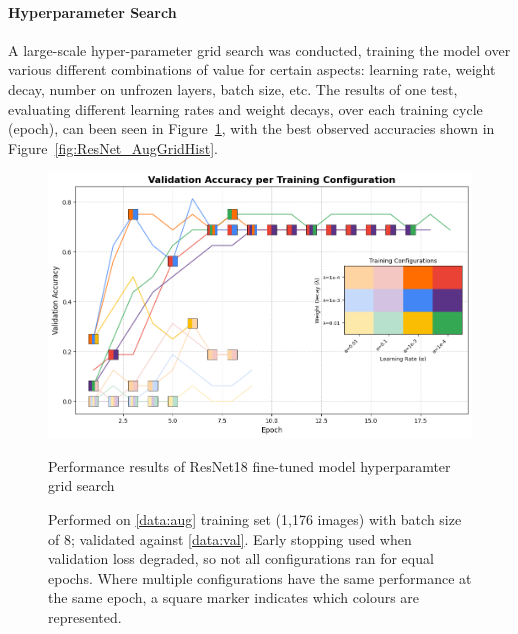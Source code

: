                     \paragraph{Hyperparameter Search}
        
                        A large-scale hyper-parameter grid search was conducted, training the model over various different combinations of value for certain aspects: learning rate, weight decay, number on unfrozen layers, batch size, etc. The results of one test, evaluating different learning rates and weight decays, over each training cycle (epoch), can been seen in Figure~\ref{fig:ResNet_AugGrid}, with the best observed accuracies shown in Figure~\ref{fig:ResNet_AugGridHist}.
                
                        \begin{figure}[h]
                            \centering
                            \includegraphics[width=\textwidth]{images/ResNetCNN_AugGrid.png}
                            \caption{Performance results of ResNet18 fine-tuned model hyperparamter grid search}
                            \caption*{Performed on \ref{data:aug} training set (1,176 images) with batch size of 8; validated against \ref{data:val}. Early stopping used when validation loss degraded, so not all configurations ran for equal epochs. Where multiple configurations have the same performance at the same epoch, a square marker indicates which colours are represented.}
                            \label{fig:ResNet_AugGrid}
                        \end{figure}
                
